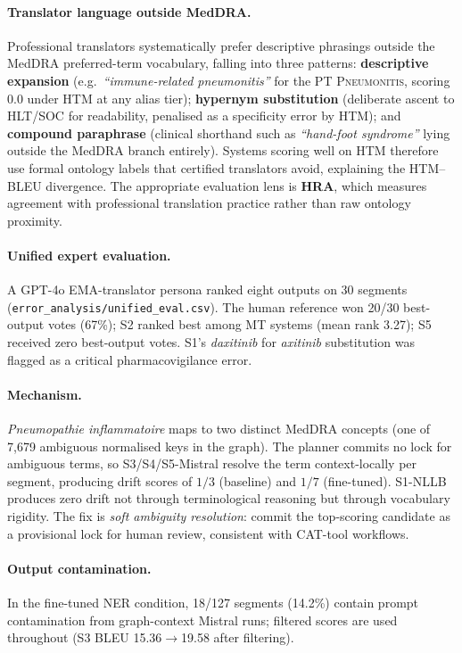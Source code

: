 \documentclass[11pt,a4paper,twocolumn]{article}
\begin{document}
\paragraph{Translator language outside MedDRA.}
Professional translators systematically prefer descriptive phrasings outside
the MedDRA preferred-term vocabulary, falling into three patterns:
\textbf{descriptive expansion} (e.g.\ \textit{``immune-related pneumonitis''} for the PT
\textsc{Pneumonitis}, scoring $0.0$ under HTM at any alias tier);
\textbf{hypernym substitution} (deliberate ascent to HLT/SOC for readability, penalised
as a specificity error by HTM); and \textbf{compound paraphrase} (clinical shorthand
such as \textit{``hand-foot syndrome''} lying outside the MedDRA branch entirely).
Systems scoring well on HTM therefore use formal ontology labels that certified
translators avoid, explaining the HTM--BLEU divergence. The appropriate
evaluation lens is \textbf{HRA}, which measures agreement with professional
translation practice rather than raw ontology proximity.

\paragraph{Unified expert evaluation.}
A GPT-4o EMA-translator persona ranked eight outputs on 30 segments
(\texttt{error\_analysis/unified\_eval.csv}).
The human reference won 20/30 best-output votes (67\%); S2 ranked best among
MT systems (mean rank 3.27); S5 received zero best-output votes.
S1's \textit{daxitinib} for \textit{axitinib} substitution was flagged as a
critical pharmacovigilance error.

\paragraph{Mechanism.}
\textit{Pneumopathie inflammatoire} maps to two distinct MedDRA concepts
(one of 7,679 ambiguous normalised keys in the graph). The planner commits
no lock for ambiguous terms, so S3/S4/S5-Mistral resolve the term
context-locally per segment, producing drift scores of $1/3$ (baseline)
and $1/7$ (fine-tuned). S1-NLLB produces zero drift not through
terminological reasoning but through vocabulary rigidity. The fix is
\emph{soft ambiguity resolution}: commit the top-scoring candidate as a
provisional lock for human review, consistent with CAT-tool workflows.

\paragraph{Output contamination.}
In the fine-tuned NER condition, 18/127 segments (14.2\%) contain prompt
contamination from graph-context Mistral runs; filtered scores are used
throughout (S3 BLEU 15.36$\to$19.58 after filtering).
\end{document}
